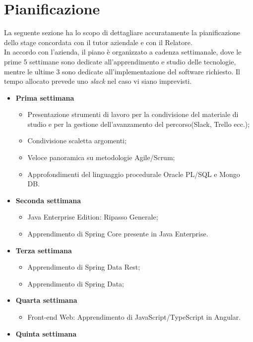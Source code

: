 \section{Pianificazione}
La seguente sezione ha lo scopo di dettagliare accuratamente la pianificazione dello stage concordata con il tutor aziendale e con il Relatore.\\
In accordo con l'azienda, il piano è organizzato a cadenza settimanale, dove le prime 5 settimane sono dedicate all'apprendimento e studio delle tecnologie, mentre le ultime 3 sono dedicate all'implementazione del software richiesto.
Il tempo allocato prevede uno \textit{slack} nel caso vi siano imprevisti.

\begin{itemize}
	\item \textbf{Prima settimana}
		\begin{itemize}
			\item Presentazione strumenti di lavoro per la condivisione del materiale di
			studio e per la gestione dell’avanzamento del percorso(Slack, Trello ecc.);
			\item Condivisione scaletta argomenti;
			\item Veloce panoramica su metodologie Agile/Scrum;
			\item Approfondimenti del linguaggio procedurale Oracle PL/SQL e Mongo
			DB.
		\end{itemize}
	\item \textbf{Seconda settimana}
		\begin{itemize}
			\item Java Enterprise Edition: Ripasso Generale;
			\item Apprendimento di Spring Core presente in Java Enterprise.
		\end{itemize}
	\item \textbf{Terza settimana}
		\begin{itemize}
			\item Apprendimento di Spring Data Rest;
			\item Apprendimento di Spring Data;
		\end{itemize}	
	\item \textbf{Quarta settimana}\\
		\begin{itemize}
			\item Front-end Web: Apprendimento di JavaScript/TypeScript in Angular.
		\end{itemize}	
	\item \textbf{Quinta settimana}	

\end{itemize}
